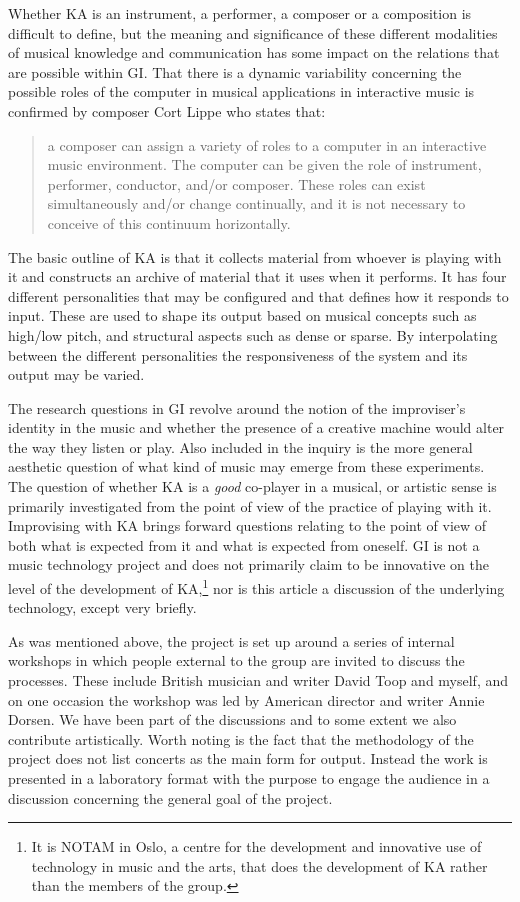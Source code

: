 \documentclass[11pt]{article}
\begin{document}
Whether KA is an instrument, a performer, a composer or a composition
is difficult to define, but the meaning and significance of these
different modalities of musical knowledge and communication has some
impact on the relations that are possible within GI. That there is a
dynamic variability concerning the possible roles of the computer in
musical applications in interactive music is confirmed by composer
Cort Lippe who states that:
\begin{quote}
    a composer can assign a variety of roles to a computer in an
    interactive music environment. The computer can be given the role
    of instrument, performer, conductor, and/or composer. These roles
    can exist simultaneously and/or change continually, and it is not
    necessary to conceive of this continuum
    horizontally. \citep[2]{Lippe2002}
\end{quote}

The basic outline of KA is that it collects material from whoever is
playing with it and constructs an archive of material that it uses
when it performs. It has four different personalities that may be
configured and that defines how it responds to input. These are used
to shape its output based on musical concepts such as high/low pitch,
and structural aspects such as dense or sparse. By interpolating
between the different personalities the responsiveness of the system
and its output may be varied.

The research questions in GI revolve around the notion of the
improviser's identity in the music and whether the presence of a
creative machine would alter the way they listen or play. Also
included in the inquiry is the more general aesthetic question of what
kind of music may emerge from these experiments. The question of
whether KA is a \emph{good} co-player in a musical, or artistic sense
is primarily investigated from the point of view of the practice of
playing with it. Improvising with KA brings forward questions relating
to the point of view of both what is expected from it and what is
expected from oneself. GI is not a music technology project and does
not primarily claim to be innovative on the level of the development
of KA,\footnote{It is NOTAM in Oslo, a centre for the development and
    innovative use of technology in music and the arts, that does the
    development of KA rather than the members of the group.} nor is
this article a discussion of the underlying technology, except very
briefly.

As was mentioned above, the project is set up around a series of
internal workshops in which people external to the group are invited
to discuss the processes. These include British musician and writer
David Toop and myself, and on one occasion the workshop was led by
American director and writer Annie Dorsen. We have been part of the
discussions and to some extent we also contribute artistically. Worth
noting is the fact that the methodology of the project does not list
concerts as the main form for output. Instead the work is presented in
a laboratory format with the purpose to engage the audience in a
discussion concerning the general goal of the project.
\end{document}

